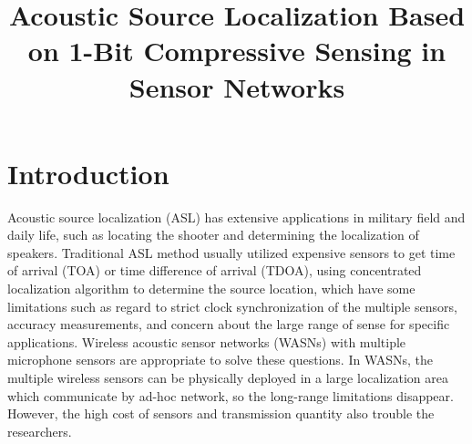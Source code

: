 \documentclass[journal]{IEEEtran}
\begin{document}
\pagestyle{empty}
\thispagestyle{empty}
\title{Acoustic Source Localization Based on 1-Bit Compressive Sensing in Sensor Networks\vspace{-1mm}}
\maketitle

\pagestyle{empty}
\thispagestyle{empty}






\IEEEpeerreviewmaketitle

\section{Introduction}
Acoustic source localization (ASL) has extensive applications in military field and daily life, such as locating the shooter and determining the localization of speakers. Traditional ASL method usually utilized expensive sensors to get time of arrival (TOA) or time difference of arrival (TDOA), using concentrated localization algorithm to determine the source location, which have some limitations such as regard to strict clock synchronization of the multiple sensors, accuracy measurements, and concern about the large range of sense for specific applications. Wireless acoustic sensor networks (WASNs) with multiple microphone sensors are appropriate to solve these questions. In WASNs, the multiple wireless sensors can be physically deployed in a large localization area which communicate by ad-hoc network, so the long-range limitations disappear. However, the high cost of sensors and transmission quantity also trouble the researchers.
\end{document}
